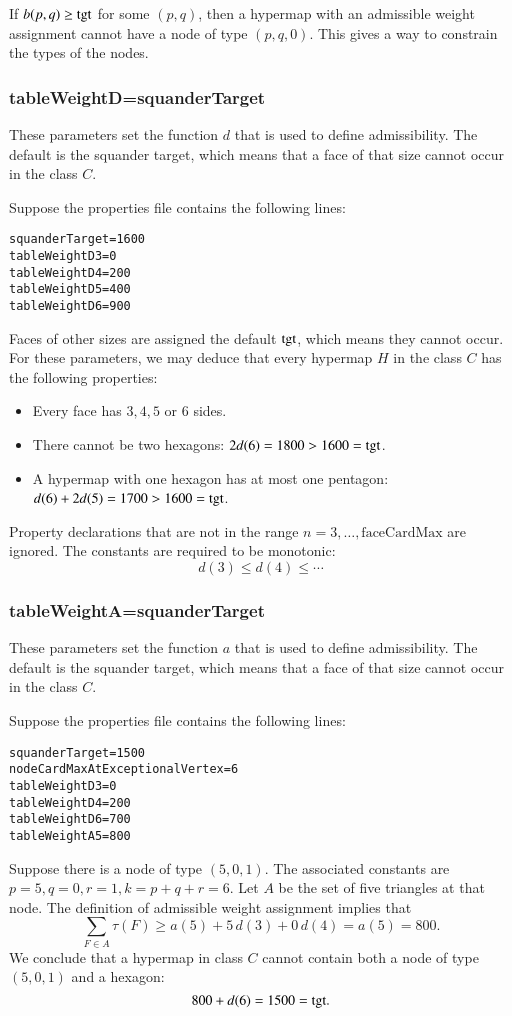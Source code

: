 \begin{example} If $b(p,q)\ge{\operatorname{tgt}}$ for some $(p,q)$, then a hypermap with
an admissible weight assignment cannot have a node of type $(p,q,0)$.  This gives
a way to constrain the types of the nodes.
\end{example}

\subsubsection{tableWeightD\wild =squanderTarget}

These parameters set the function $d$ that is used to define admissibility.
The default is the squander target, which means that a face of that size cannot occur
in the class $C$.

\begin{example} Suppose the properties file contains the following lines:
\begin{verbatim}
squanderTarget=1600
tableWeightD3=0
tableWeightD4=200
tableWeightD5=400
tableWeightD6=900
\end{verbatim}
Faces of other sizes are assigned the default ${\operatorname{tgt}}$, 
which means they cannot occur.  
For these parameters, 
we may deduce that
every hypermap $H$ in the class $C$ has the following properties:
\begin{itemize}
\item Every face has $3,4,5$ or $6$ sides.
\item There cannot be two hexagons: $2d(6) =1800 > 1600={\operatorname{tgt}}$.
\item A hypermap with one hexagon has at most one pentagon: $d(6)+2d(5) = 1700 > 1600 = {\operatorname{tgt}}$.
\end{itemize}
\end{example}
Property declarations 
that are not in the range $n=3,\ldots,\text{faceCardMax}$ are ignored.
The constants are required to be monotonic:
\[
d(3) \le d(4) \le \cdots
\]

\subsubsection{tableWeightA\wild =squanderTarget}

These parameters set the function $a$ that is used to define admissibility.
The default is the squander target, which means that a face of that size cannot occur
in the class $C$.

\begin{example} Suppose the properties file contains the following lines:
\begin{verbatim}
squanderTarget=1500
nodeCardMaxAtExceptionalVertex=6
tableWeightD3=0
tableWeightD4=200
tableWeightD6=700
tableWeightA5=800
\end{verbatim}
Suppose there is a node of type $(5,0,1)$. The associated constants
are $p=5,q=0,r=1,k=p+q+r=6$.
Let  $A$ be the set of five triangles at that node.  The definition of admissible
weight assignment implies that
\[
\sum_{F\in A}\tau(F) \ge a(5) + 5\, d(3) + 0\, d(4) = a(5) = 800.
\]
We conclude that a hypermap in class $C$ cannot contain both a node of type $(5,0,1)$
and a hexagon: 
\[
800 + d(6) = 1500 = {\operatorname{tgt}}.
\]
\end{example}

